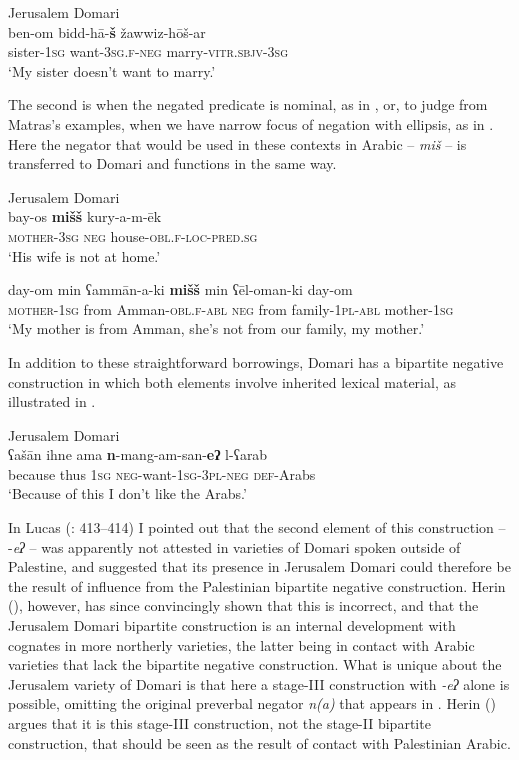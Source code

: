 \documentclass[output=paper]{langsci/langscibook}
\begin{document}
\ea\label{dom}
{       Jerusalem Domari \citep[351]{Matras2012}}\\
\gll ben-om bidd-hā-\textbf{š} žawwiz-hōš-ar\\
     sister-\textsc{1sg} want\textsc{{}-3sg.f-neg} marry\textsc{-vitr.sbjv-3sg}\\
\glt ‘My sister doesn’t want to marry.’
\z

The second is when the negated predicate is nominal, as in , or, to judge from Matras’s examples, when we have narrow focus of negation with ellipsis, as in . Here the negator that would be used in these contexts in Arabic – \textit{miš} – is transferred to Domari and functions in the same way.

\ea
{Jerusalem Domari \citep[350]{Matras2012}}\\
\ea\gll bay-os \textbf{mišš} kury-a-m-ēk\label{jer.a}\\
     \textsc{\textup{mother-}}\textsc{3sg} \textsc{neg} house\textsc{-obl.f-loc-pred.sg}  \\
\glt ‘His wife is not at home.’

\ex\gll day-om min ʕammān-a-ki \textbf{mišš} min ʕēl-oman-ki day-om\label{jer.b}\\
     \textsc{\textup{mother-1}}\textsc{sg} from Amman-\textsc{obl.f-abl} \textsc{neg} from family-\textsc{1pl-abl} mother\textsc{-1sg}\\
\glt ‘My mother is from Amman, she’s not from our family, my mother.’
\z
\z

In addition to these straightforward borrowings, Domari has a bipartite negative construction in which both elements involve inherited lexical material, as illustrated in .

\ea\label{jer.c}
{       Jerusalem Domari \citep[117]{Matras2012}}\\
\gll ʕašān ihne ama \textbf{n}-mang-am-san-\textbf{eʔ} l-ʕarab\\
     because thus \textsc{1sg} \textsc{neg-}want-\textsc{1sg-3pl-neg} \textsc{def-}Arabs\\
\glt ‘Because of this I don’t like the Arabs.’
\z

In Lucas (\citeyear{Lucas2013}: 413–414) I pointed out that the second element of this construction – -\textit{eʔ} – was apparently not attested in varieties of Domari spoken outside of Palestine, and suggested that its presence in Jerusalem Domari could therefore be the result of influence from the Palestinian bipartite negative construction. Herin (\citeyear{Herin2016,Herin2018}), however, has since convincingly shown that this is incorrect, and that the Jerusalem Domari bipartite construction is an internal development with cognates in more northerly varieties, the latter being in contact with Arabic varieties that lack the bipartite negative construction. What is unique about the Jerusalem variety of Domari is that here a stage-III construction with \textit{{}-eʔ} alone is possible, omitting the original preverbal negator \textit{n(a)} that appears in . Herin (\citeyear[32]{Herin2018}) argues that it is this stage-III construction, not the stage-II bipartite construction, that should be seen as the result of contact with Palestinian Arabic. 
\end{document}
